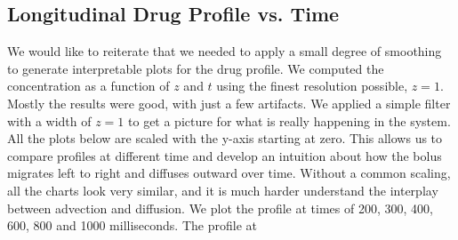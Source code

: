 \documentclass[11pt]{article} %
\begin{document}
\subsection{Longitudinal Drug Profile vs. Time}
We would like to reiterate that we needed to apply a small degree of smoothing
to generate interpretable plots for the drug profile.  
We computed the concentration as a function of $z$ and $t$ using the finest resolution
possible, $z=1$.  Mostly the results were good, with just a few artifacts.
We applied a simple filter with a width of $z=1$ to get a picture for what is really happening
in the system.  
All the plots below are scaled with the y-axis starting at zero.  
This allows us to compare profiles at different time and develop an intuition
about how the bolus migrates left to right and diffuses outward over time.
Without a common scaling, all the charts look very similar, and it is
much harder understand the interplay between advection and diffusion.
We plot the profile at times of 200, 300, 400, 600, 800 and 1000 milliseconds.
The profile at 
\end{document}
